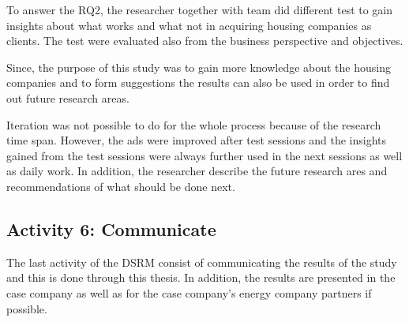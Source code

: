 To answer the RQ2, the researcher together with team did different test to gain insights about what works and what not in acquiring housing companies as clients. The test were evaluated also from the business perspective and objectives.

Since, the purpose of this study was to gain more knowledge about the housing companies and to form suggestions the results can also be used in order to find out future research areas.

Iteration was not possible to do for the whole process because of the research time span. However, the ads were improved after test sessions and the insights gained from the test sessions were always further used in the next sessions as well as daily work. In addition, the researcher describe the future research ares and recommendations of what should be done next.

\subsection{Activity 6: Communicate}

The last activity of the DSRM consist of communicating the results of the study and this is done through this thesis. In addition, the results are presented in the case company as well as for the case company's energy company partners if possible.